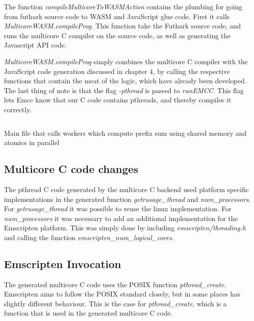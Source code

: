 \documentclass[11pt]{book}
\begin{document}
The function \textit{compileMulticoreToWASMAction} contains the plumbing for going from futhark source code to WASM and JavaScript glue code. First it calls \textit{MulticoreWASM.compileProg}. This function take the Futhark source code, and runs the multicore C compiler on the source code, as well as generating the Javascript API code.

\textit{MulticoreWASM.compileProg} simply combines the multicore C compiler with the JavaScript code generation discussed in chapter 4, by calling the respective functions that contain the meat of the logic, which have already been developed. The last thing of note is that the flag \textit{-pthread} is passed to \textit{runEMCC}. This flag lets Emcc know that our C code contains pthreads, and thereby compiles it correctly.


\begin{listing}[H]    
        \inputminted[fontsize=\small,baselinestretch=0.5,linenos,breaklines]{haskell}{code/actionmc.hs}
        \caption{Main file that calls workers which compute prefix sum using shared memory and atomics in parallel}    
        \label{lst:action-mc}    
\end{listing}    
\subsection{Multicore C code changes}
The pthread C code generated by the multicore C backend used platform specific implementations in the generated function \textit{getrusage\_thread} and \textit{num\_processors}. For \textit{getrusage\_thread} it was possible to reuse the linux implementation. For \textit{num\_processors} it was necessary to add an additional implementation for the Emscripten platform. This was simply done by including \textit{emscripten/threading.h} and calling the function \textit{emscripten\_num\_logical\_cores}.




\subsection{Emscripten Invocation}

The generated multicore C code uses the POSIX function \textit{pthread\_create}. Emscripten aims to follow the POSIX standard closely, but in some places has slightly different behaviour. This is the case for \textit{pthread\_create}, which is a function that is used in the generated multicore C code. 
\end{document}

